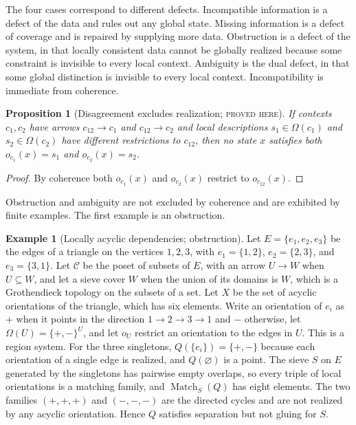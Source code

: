 \documentclass[11pt]{article}
\newtheorem{proposition}[theorem]{Proposition}
\theoremstyle{definition}
\newtheorem{example}[theorem]{Example}
\theoremstyle{remark}
\newcommand{\stN}{\textsc{proved here}}
\newcommand{\cC}{\mathcal C}
\newcommand{\Match}{\operatorname{Match}}
\begin{document}
The four cases correspond to different defects. Incompatible information is a defect of the data and rules out any global state. Missing information is a defect of coverage and is repaired by supplying more data. Obstruction is a defect of the system, in that locally consistent data cannot be globally realized because some constraint is invisible to every local context. Ambiguity is the dual defect, in that some global distinction is invisible to every local context. Incompatibility is immediate from coherence.

\begin{proposition}[Disagreement excludes realization; \stN]\label{prop:disagree}
If contexts $c_1,c_2$ have arrows $c_{12}\to c_1$ and $c_{12}\to c_2$ and local descriptions $s_1\in\Omega(c_1)$ and $s_2\in\Omega(c_2)$ have different restrictions to $c_{12}$, then no state $x$ satisfies both $o_{c_1}(x)=s_1$ and $o_{c_2}(x)=s_2$.
\end{proposition}
\begin{proof}
By coherence both $o_{c_1}(x)$ and $o_{c_2}(x)$ restrict to $o_{c_{12}}(x)$.
\end{proof}

Obstruction and ambiguity are not excluded by coherence and are exhibited by finite examples. The first example is an obstruction.

\begin{example}[Locally acyclic dependencies; obstruction]\label{ex:triangle}
Let $E=\{e_1,e_2,e_3\}$ be the edges of a triangle on the vertices $1,2,3$, with $e_1=\{1,2\}$, $e_2=\{2,3\}$, and $e_3=\{3,1\}$. Let $\cC$ be the poset of subsets of $E$, with an arrow $U\to W$ when $U\subseteq W$, and let a sieve cover $W$ when the union of its domains is $W$, which is a Grothendieck topology on the subsets of a set. Let $X$ be the set of acyclic orientations of the triangle, which has six elements. Write an orientation of $e_i$ as $+$ when it points in the direction $1\to2\to3\to1$ and $-$ otherwise, let $\Omega(U)=\{+,-\}^U$, and let $o_U$ restrict an orientation to the edges in $U$. This is a region system. For the three singletons, $Q(\{e_i\})=\{+,-\}$ because each orientation of a single edge is realized, and $Q(\varnothing)$ is a point. The sieve $S$ on $E$ generated by the singletons has pairwise empty overlaps, so every triple of local orientations is a matching family, and $\Match_S(Q)$ has eight elements. The two families $(+,+,+)$ and $(-,-,-)$ are the directed cycles and are not realized by any acyclic orientation. Hence $Q$ satisfies separation but not gluing for $S$.
\end{example}
\end{document}
